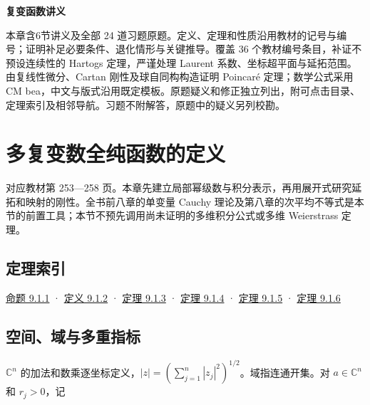 \documentclass[11pt,a4paper]{article}
\begin{document}
\begin{center}
{\LARGE\bfseries 复变函数讲义\par}
\vspace{8pt}{\large 第九章\quad 多复变数全纯函数与全纯映射\par}
\vspace{6pt}{\small 依史济怀、刘太顺《复变函数》\quad 教材第 253—278 页\par}
\end{center}\vspace{8pt}
本章含6节讲义及全部 24 道习题原题。定义、定理和性质沿用教材的记号与编号；证明补足必要条件、退化情形与关键推导。覆盖 36 个教材编号条目，补证不预设连续性的 Hartogs 定理，严谨处理 Laurent 系数、坐标超平面与延拓范围。由复线性微分、Cartan 刚性及球自同构构造证明 Poincaré 定理；数学公式采用 CM bea，中文与版式沿用既定模板。原题疑义和修正独立列出，附可点击目录、定理索引及相邻导航。习题不附解答，原题中的疑义另列校勘。
\begingroup\setlength{\parskip}{0pt}\hypertarget{chapter9-contents}{}\tableofcontents\endgroup\clearpage
{}
\section{多复变数全纯函数的定义}
\hypertarget{chapter9-part-1}{}
\par
对应教材第 253---258
页。本章先建立局部幂级数与积分表示，再用展开式研究延拓和映射的刚性。全书前八章的单变量
Cauchy
理论及第八章的次平均不等式是本节的前置工具；本节不预先调用尚未证明的多维积分公式或多维
Weierstrass 定理。

\subsection*{定理索引}\label{ch09-s1-heading-1}

\hyperref[ch09-s1-heading-3]{命题 9.1.1} · \hyperref[ch09-s1-heading-4]{定义 9.1.2} ·
\hyperref[ch09-s1-heading-5]{定理 9.1.3} · \hyperref[ch09-s1-heading-6]{定理 9.1.4} ·
\hyperref[ch09-s1-heading-7]{定理 9.1.5} · \hyperref[ch09-s1-heading-8]{定理 9.1.6}

\subsection*{空间、域与多重指标}\label{ch09-s1-heading-2}

\(\mathbb C^n\)
的加法和数乘逐坐标定义，\(|z|=(\sum_{j=1}^n|z_j|^2)^{1/2}\)。域指连通开集。对
\(a\in\mathbb C^n\) 和 \(r_j>0\)，记
\end{document}
